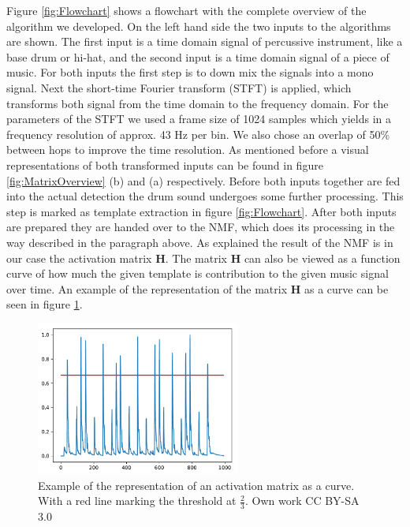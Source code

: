 \documentclass{article}
\begin{document}
Figure \ref{fig:Flowchart} shows a flowchart with the complete overview of the algorithm we developed.
On the left hand side the two inputs to the algorithms are shown.
The first input is a time domain signal of percussive instrument, like a base drum or hi-hat, and the second input is a time domain signal of a piece of music.
For both inputs the first step is to down mix the signals into a mono signal.
Next the short-time Fourier transform (STFT) is applied, which transforms both signal from the time domain to the frequency domain.
For the parameters of the STFT we used a frame size of 1024 samples which yields in a frequency resolution of approx. 43 Hz per bin.
We also chose an overlap of 50\% between hops to improve the time resolution.
As mentioned before a visual representations of both transformed inputs can be found in figure \ref{fig:MatrixOverview} (b) and (a) respectively.
Before both inputs together are fed into the actual detection the drum sound undergoes some further processing.
This step is marked as template extraction in figure \ref{fig:Flowchart}.
After both inputs are prepared they are handed over to the NMF, which does its processing in the way described in the paragraph above.
As explained the result of the NMF is in our case the activation matrix $\mathbf{H}$.
The matrix $\mathbf{H}$ can also be viewed as a function curve of how much the given template is contribution to the given music signal over time.
An example of the representation of the matrix $\mathbf{H}$ as a curve can be seen in figure \ref{fig:ActivationMatrix}.

\begin{figure}[htb]

\begin{minipage}[b]{1.0\linewidth}
  \centering
  \centerline{\includegraphics[width=6.7cm]{figures/ActivationMatrix}}
  \medskip
\end{minipage}

\caption{Example of the representation of an activation matrix as a curve. With a red line marking the threshold at $\frac{2}{3}$. \scriptsize{\textsf{\textcopyright} Own work CC BY-SA 3.0}}
\label{fig:ActivationMatrix}

\end{figure}
\end{document}
